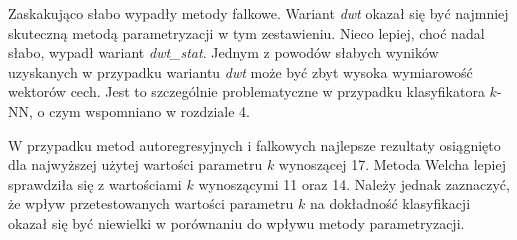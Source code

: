 \documentclass[notitlepage]{report}
\begin{document}
Zaskakująco słabo wypadły metody falkowe. Wariant \textit{dwt} okazał się być najmniej skuteczną metodą parametryzacji w tym zestawieniu. Nieco lepiej, choć nadal słabo, wypadł wariant \textit{dwt\_stat}. Jednym z powodów słabych wyników uzyskanych w przypadku wariantu \textit{dwt} może być zbyt wysoka wymiarowość wektorów cech. Jest to szczególnie problematyczne w przypadku klasyfikatora $k$-NN, o czym wspomniano w rozdziale 4.

W przypadku metod autoregresyjnych i falkowych najlepsze rezultaty osiągnięto dla najwyższej użytej wartości parametru $k$ wynoszącej 17. Metoda Welcha lepiej sprawdziła się z wartościami $k$ wynoszącymi 11 oraz 14. Należy jednak zaznaczyć, że wpływ przetestowanych wartości parametru $k$ na dokładność klasyfikacji okazał się być niewielki w porównaniu do wpływu metody parametryzacji.
\end{document}
